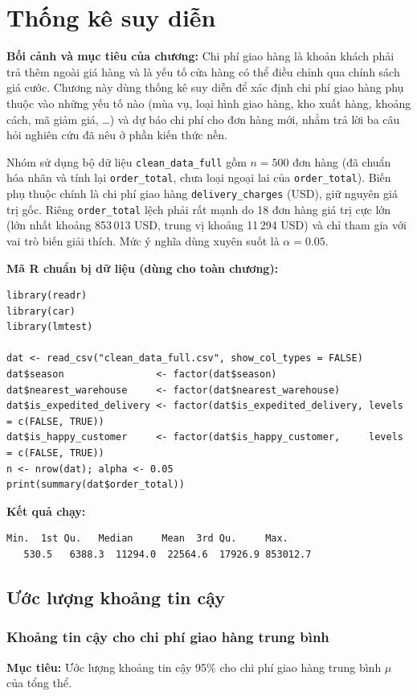 \section{Thống kê suy diễn}
\textbf{Bối cảnh và mục tiêu của chương:} Chi phí giao hàng là khoản khách phải trả thêm ngoài giá hàng và là yếu tố cửa hàng có thể điều chỉnh qua chính sách giá cước. Chương này dùng thống kê suy diễn để xác định chi phí giao hàng phụ thuộc vào những yếu tố nào (mùa vụ, loại hình giao hàng, kho xuất hàng, khoảng cách, mã giảm giá, \ldots) và dự báo chi phí cho đơn hàng mới, nhằm trả lời ba câu hỏi nghiên cứu đã nêu ở phần kiến thức nền.

Nhóm sử dụng bộ dữ liệu \texttt{clean\_data\_full} gồm $n = 500$ đơn hàng (đã chuẩn hóa nhãn và tính lại \texttt{order\_total}, chưa loại ngoại lai của \texttt{order\_total}). Biến phụ thuộc chính là chi phí giao hàng \texttt{delivery\_charges} (USD), giữ nguyên giá trị gốc. Riêng \texttt{order\_total} lệch phải rất mạnh do 18 đơn hàng giá trị cực lớn (lớn nhất khoảng 853\,013 USD, trung vị khoảng 11\,294 USD) và chỉ tham gia với vai trò biến giải thích. Mức ý nghĩa dùng xuyên suốt là $\alpha = 0.05$.

\textbf{Mã R chuẩn bị dữ liệu (dùng cho toàn chương):}
\begin{lstlisting}
library(readr)
library(car)     
library(lmtest)  

dat <- read_csv("clean_data_full.csv", show_col_types = FALSE)
dat$season                <- factor(dat$season)            
dat$nearest_warehouse     <- factor(dat$nearest_warehouse) 
dat$is_expedited_delivery <- factor(dat$is_expedited_delivery, levels = c(FALSE, TRUE))
dat$is_happy_customer     <- factor(dat$is_happy_customer,     levels = c(FALSE, TRUE))
n <- nrow(dat); alpha <- 0.05
print(summary(dat$order_total))   
\end{lstlisting}
\textbf{Kết quả chạy:}
\begin{lstlisting}[style=rout]
    Min.  1st Qu.   Median     Mean  3rd Qu.     Max. 
   530.5   6388.3  11294.0  22564.6  17926.9 853012.7 
\end{lstlisting}

\subsection{Ước lượng khoảng tin cậy}

\subsubsection{Khoảng tin cậy cho chi phí giao hàng trung bình}
\textbf{Mục tiêu:} Ước lượng khoảng tin cậy 95\% cho chi phí giao hàng trung bình $\mu$ của tổng thể.

